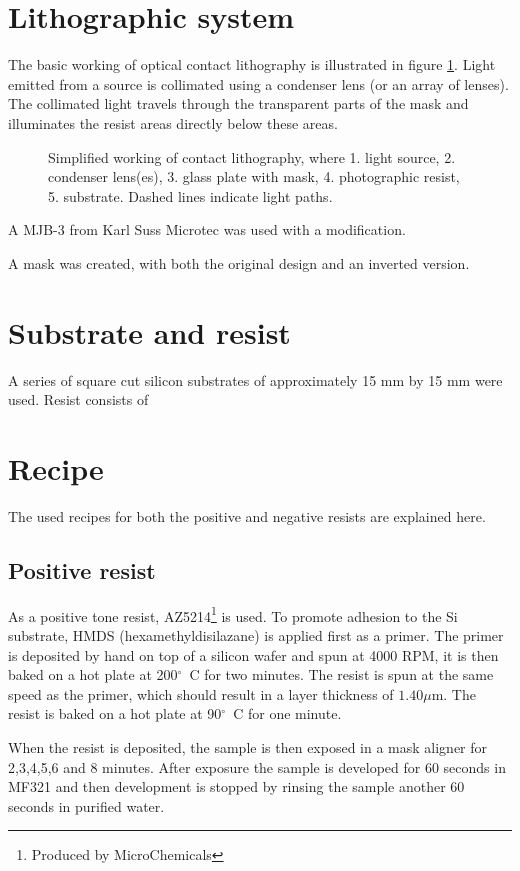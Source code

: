\section*{Lithographic system}
The basic working of optical contact lithography is illustrated in figure \ref{fig:contact-litho}. Light emitted from a source is collimated using a condenser lens (or an array of lenses). The collimated light travels through the transparent parts of the mask and illuminates the resist areas directly below these areas. 
\begin{figure}[H]
	\centering
	\resizebox{0.7\linewidth}{!}{}
	\caption{Simplified working of contact lithography, where 1. light source, 2. condenser lens(es), 3. glass plate with mask, 4. photographic resist, 5. substrate. Dashed lines indicate light paths.}
	\label{fig:contact-litho}
\end{figure} A MJB-3 from Karl Suss Microtec was used with a modification. 

A mask was created, with both the original design and an inverted version.  

\section*{Substrate and resist}
A series of square cut silicon substrates of approximately 15 mm by 15 mm were used. Resist consists of 

\section*{Recipe}
The used recipes for both the positive and negative resists are explained here.
\subsection*{Positive resist}
As a positive tone resist, AZ5214\footnote{Produced by MicroChemicals} is used. To promote adhesion to the Si substrate, HMDS (hexamethyldisilazane) is applied first as a primer. The primer is deposited by hand on top of a silicon wafer and spun at 4000 RPM, it is then baked on a hot plate at 200$^{\circ}$~C for two minutes. The resist is spun at the same speed as the primer, which should result in a layer thickness of $1.40 \mu$m. The resist is baked on a hot plate at 90$^{\circ}$~C for one minute.

When the resist is deposited, the sample is then exposed in a mask aligner for 2,3,4,5,6 and 8 minutes. After exposure the sample is developed for 60 seconds in MF321 and then development is stopped by rinsing the sample another 60 seconds in purified water.

